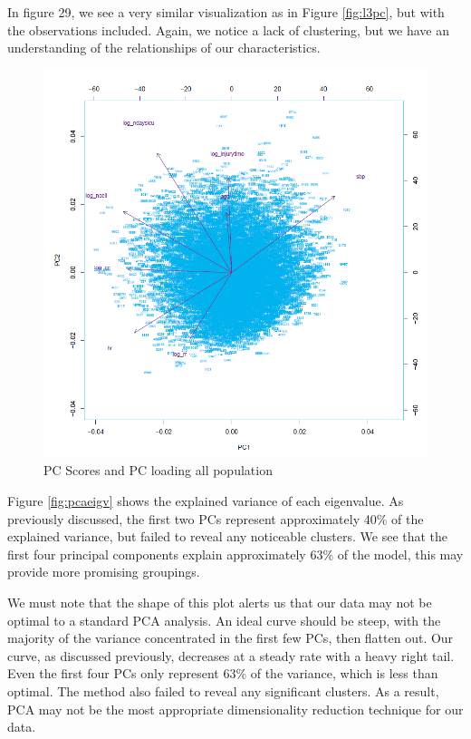 \documentclass[
]{article}
\begin{document}
In figure 29, we see a very similar visualization as in Figure
\ref{fig:l3pc}, but with the observations included. Again, we notice a
lack of clustering, but we have an understanding of the relationships of
our characteristics.

\begin{figure}
\centering
\includegraphics{../figure_output/pca_biplot.png}
\caption{PC Scores and PC loading all population}
\end{figure}

\newpage

Figure \ref{fig:pcaeigv} shows the explained variance of each
eigenvalue. As previously discussed, the first two PCs represent
approximately 40\% of the explained variance, but failed to reveal any
noticeable clusters. We see that the first four principal components
explain approximately 63\% of the model, this may provide more promising
groupings.

We must note that the shape of this plot alerts us that our data may not
be optimal to a standard PCA analysis. An ideal curve should be steep,
with the majority of the variance concentrated in the first few PCs,
then flatten out. Our curve, as discussed previously, decreases at a
steady rate with a heavy right tail. Even the first four PCs only
represent 63\% of the variance, which is less than optimal. The method
also failed to reveal any significant clusters. As a result, PCA may not
be the most appropriate dimensionality reduction technique for our data.
\end{document}
